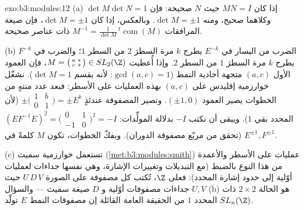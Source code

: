 \begin{solution}{exo:b3:modules:12}
(a) إذا كان $MN = I$ حيث $N$ صحيحة: فإن $\det M\det N = 1$ وكلاهما صحيح،
ومنه $\det M = \pm1$. وبالعكس، إذا كان $\det M =
\pm1$، فإن صيغة
المرافقات $M^{-1} =
\frac1{\det M}\,{}^t\!\operatorname{com}(M)$ ذات عناصر صحيحة.

(b) الضرب من اليسار في $E^{-k}$ يطرح $k$ مرة السطرَ $2$ من
السطر $1$؛ والضرب في $F^{-k}$ يطرح $k$ مرة السطرَ $1$ من السطر
$2$. وإذا أُعطيت $M = \bigl(\begin{smallmatrix}a & *\\ c &
*\end{smallmatrix}\bigr) \in SL_2(\Z)$، فإن العمود الأول $(a, c)$ متجهة
أحادية النمط ($\gcd(a, c) = 1$: لأنه يقسم $\det M = 1$). نشغّل
خوارزمية إقليدس على $(a, c)$ بهذه العمليات على الأسطر: فبعد عدد
منتهٍ من الخطوات يصير العمود $(\pm1, 0)$. وتصير المصفوفة عندئذٍ
$\pm
\bigl(\begin{smallmatrix}1 & b\\ 0 & 1\end{smallmatrix}
\bigr) = \pm E^{b}$ (لأن المحدد بقي $1$). ويبقى أن نكتب $-I$ بدلالة
المولِّدات: $(EF^{-1}E)^2 =
\bigl(\begin{smallmatrix}0 & 1\\ -1 &
0\end{smallmatrix}\bigr)^2 = -I$ (تحقق من مربّع مصفوفة الدوران). وبفكّ
الخطوات، تكون $M$ كلمةً في $E^{\pm1},
F^{\pm1}$.

(c) تستعمل خوارزمية سميث (\cref{met:b3:modules:smith}) عمليات على الأسطر
والأعمدة من هذا النوع بالضبط (مع التبديلات وتغييرات الإشارة،
وهي نفسها جداءات لعمليات أوّلية إلى حدود إشارة المحدد): فعلى
$\Z$، تُكتب كل مصفوفة على الصورة $U\,D\,V$ حيث $U, V$ جداءات
مصفوفات أوّلية و $D$ صيغة سميث --- والسؤال (b) هو الحالة
$2\times2$ ذات المحدد $1$ من الحقيقة العامة القائلة إن مصفوفات
النمط $E$ تولّد $SL_n(\Z)$.
\end{solution}

